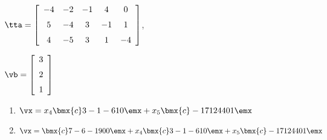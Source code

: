 {$\tta = \left[ \begin {array}{ccccc} -4&-2&-1&4&0\\\noalign{\medskip}5&-4&3&-1
&1\\\noalign{\medskip}4&-5&3&1&-4\end {array} \right] $, 

$\vb=\left[ \begin {array}{c} 3\\\noalign{\medskip}2\\\noalign{\medskip}1
\end {array} \right] $}
{\begin{enumerate}
\item	 $\vx=x_4\bmx{c}3\\ -1 \\-6 \\1\\0\emx + x_5\bmx{c} -17\\ 12 \\ 44 \\0\\1 \emx$

\item	$\vx=\bmx{c} 7\\ -6 \\ -19 \\ 0\\ 0  \emx + x_4\bmx{c}3\\ -1 \\-6 \\1\\0\emx + x_5\bmx{c} -17\\ 12 \\ 44 \\0\\1 \emx$
\end{enumerate}}




